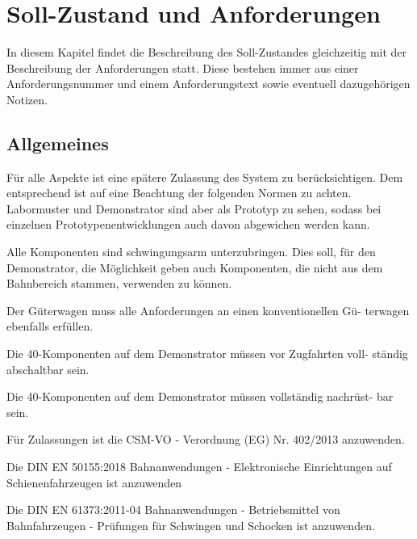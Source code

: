 \section{Soll-Zustand und Anforderungen}
In diesem Kapitel findet die Beschreibung des Soll-Zustandes gleichzeitig %
mit der Beschreibung der Anforderungen statt. Diese bestehen immer aus einer Anforderungsnummer und einem Anforderungstext sowie eventuell dazugehörigen Notizen.\par

\subsection{Allgemeines}
Für alle Aspekte ist eine spätere Zulassung des System zu berücksichtigen. Dem entsprechend ist auf eine Beachtung der folgenden Normen zu achten. Labormuster und \gls{Demonstrator} sind aber als Prototyp zu sehen, sodass bei einzelnen Prototypenentwicklungen auch davon abgewichen werden kann. \par
Alle Komponenten sind schwingungsarm unterzubringen. Dies soll, für den Demonstrator, die Möglichkeit geben auch Komponenten, die nicht aus dem Bahnbereich stammen, verwenden zu können.
\begin{feat}
Der Güterwagen muss alle Anforderungen an einen konventionellen Gü- terwagen ebenfalls erfüllen.
\end{feat}
\begin{feat}
Die \gls{40-Komponenten} auf dem \gls{Demonstrator} müssen vor Zugfahrten voll- ständig abschaltbar sein.
\end{feat}
\begin{feat}
Die \gls{40-Komponenten} auf dem \gls{Demonstrator} müssen vollständig nachrüst- bar sein.
\end{feat}
\begin{feat}
Für Zulassungen ist die CSM-VO - Verordnung (EG) Nr. 402/2013 anzuwenden.
\end{feat}
\begin{feat}
Die \acrshort{DIN} \acrshort{EN} 50155:2018 Bahnanwendungen - Elektronische Einrichtungen auf Schienenfahrzeugen ist anzuwenden
\end{feat}
\begin{feat}
Die \acrshort{DIN} \acrshort{EN} 61373:2011-04 Bahnanwendungen - Betriebsmittel von Bahnfahrzeugen - Prüfungen für Schwingen und Schocken ist anzuwenden.
\end{feat}
